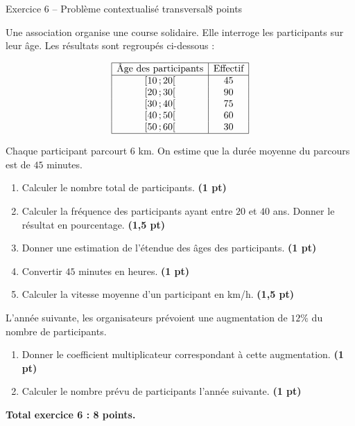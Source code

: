\documentclass[11pt,a4paper]{article}
\newcommand{\pts}[1]{\hfill \textbf{(#1 pt)}}
\newcommand{\classe}[2]{\ensuremath{[#1\,;#2[}}
\begin{document}
\begin{exercicebox}{Exercice 6 -- Problème contextualisé transversal}{8 points}

Une association organise une course solidaire. Elle interroge les participants sur leur âge. Les résultats sont regroupés ci-dessous :

\[
\begin{array}{|c|c|}
\hline
\text{Âge des participants} & \text{Effectif} \\
\hline
\classe{10}{20} & 45 \\
\classe{20}{30} & 90 \\
\classe{30}{40} & 75 \\
\classe{40}{50} & 60 \\
\classe{50}{60} & 30 \\
\hline
\end{array}
\]

Chaque participant parcourt $6$ km. On estime que la durée moyenne du parcours est de $45$ minutes.

\begin{enumerate}
    \item Calculer le nombre total de participants. \pts{1}

    \item Calculer la fréquence des participants ayant entre $20$ et $40$ ans. Donner le résultat en pourcentage. \pts{1,5}

    \item Donner une estimation de l’étendue des âges des participants. \pts{1}

    \item Convertir $45$ minutes en heures. \pts{1}

    \item Calculer la vitesse moyenne d’un participant en km/h. \pts{1,5}
\end{enumerate}

L’année suivante, les organisateurs prévoient une augmentation de $12\%$ du nombre de participants.

\begin{enumerate}[resume]
    \item Donner le coefficient multiplicateur correspondant à cette augmentation. \pts{1}

    \item Calculer le nombre prévu de participants l’année suivante. \pts{1}
\end{enumerate}

\textbf{Total exercice 6 : 8 points.}

\end{exercicebox}
\end{document}
